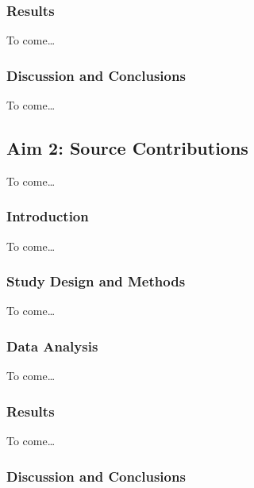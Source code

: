 \documentclass[
  letterpaper,
  DIV=11,
  numbers=noendperiod]{scrartcl}
\begin{document}
\hypertarget{results}{%
\subsubsection{Results}\label{results}}

To come\ldots{}

\hypertarget{discussion-and-conclusions}{%
\subsubsection{Discussion and
Conclusions}\label{discussion-and-conclusions}}

To come\ldots{}

\hypertarget{aim-2-source-contributions}{%
\subsection{Aim 2: Source
Contributions}\label{aim-2-source-contributions}}

To come\ldots{}

\hypertarget{introduction-2}{%
\subsubsection{Introduction}\label{introduction-2}}

To come\ldots{}

\hypertarget{study-design-and-methods-1}{%
\subsubsection{Study Design and
Methods}\label{study-design-and-methods-1}}

To come\ldots{}

\hypertarget{data-analysis-1}{%
\subsubsection{Data Analysis}\label{data-analysis-1}}

To come\ldots{}

\hypertarget{results-1}{%
\subsubsection{Results}\label{results-1}}

To come\ldots{}

\hypertarget{discussion-and-conclusions-1}{%
\subsubsection{Discussion and
Conclusions}\label{discussion-and-conclusions-1}}
\end{document}
